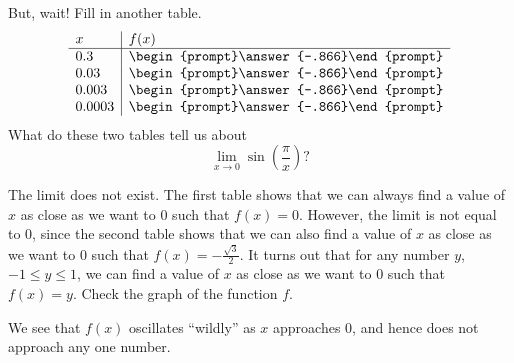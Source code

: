 \documentclass{ximera}
\begin{document}
\begin{question}
But, wait! Fill in another table.
  \[
  \begin{array}{l|l}
    x      & f(x)            \\ \hline
    0.3    &  \begin{prompt}\answer{-.866}\end{prompt} \\
    0.03   &  \begin{prompt}\answer{-.866}\end{prompt} \\
    0.003  &  \begin{prompt}\answer{-.866}\end{prompt} \\
    0.0003 &  \begin{prompt}\answer{-.866}\end{prompt}
  \end{array}
  \]
  What do these two tables tell us about
  \[
  \lim_{x\to 0}\sin\left(\frac{\pi}{x}\right)?
  \]
  \begin{multipleChoice}
  \end{multipleChoice}
  \begin{feedback}
   The limit does not exist. The first table shows that we can always find a value of $x$ as close as we want to $0$ such that $f(x)=0$.
   However, the limit is not equal to $0$, since the second table shows that we can also find a value of $x$ as close as we want to $0$ such that $f(x)=-\frac{\sqrt{3}}{2}$.
   It turns out that  for any number $y$, $-1\le y\le1$, we can find a value of $x$ as close as we want to $0$ such that $f(x)=y$. Check the graph of the function $f$.
    \begin{image}
    \end{image}
   We see that $f(x)$ oscillates ``wildly'' as $x$ approaches $0$, and hence does not approach any one number.
  \end{feedback}
\end{question}
\end{document}
